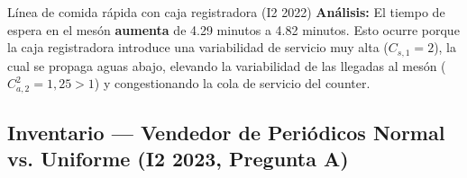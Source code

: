 \begin{ejercicio}{Línea de comida rápida con caja registradora (I2 2022)}
\textbf{Análisis:} El tiempo de espera en el mesón \textbf{aumenta} de 4.29 minutos a 4.82 minutos. Esto ocurre porque la caja registradora introduce una variabilidad de servicio muy alta ($C_{s,1} = 2$), la cual se propaga aguas abajo, elevando la variabilidad de las llegadas al mesón ($C_{a,2}^2 = 1{,}25 > 1$) y congestionando la cola de servicio del counter.
\end{ejercicio}



\subsection[Inventario: Newsvendor (I2 2023)]{Inventario --- Vendedor de Periódicos Normal vs. Uniforme (I2 2023, Pregunta A)}

